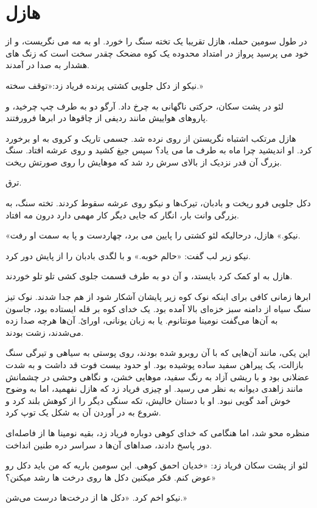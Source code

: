 \documentclass{book}
\begin{document}
\chapter{هازل}
در طول سومین حمله، هازل تقریبا یک تخته سنگ را خورد. او به مه می نگریست، و از خود می پرسید  پرواز در امتداد محدوده یک کوه مضحک چقدر سخت است که زنگ های هشدار به صدا در آمدند.

نیکو از دکل جلویی کشتی پرنده فریاد زد:«توقف سخته.»

لئو در پشت سکان، حرکتی ناگهانی به چرخ داد. آرگو دو به طرف چپ چرخید، و پاروهای هواییش مانند ردیفی از چاقوها در ابرها فرورفتند.

هازل مرتکب اشتباه نگریستن از روی نرده شد. جسمی تاریک و کروی به او برخورد کرد. او اندیشید چرا ماه به طرف ما می یاد؟ سپس جیغ کشید و روی عرشه افتاد. سنگ بزرگ آن قدر نزدیک از بالای سرش رد شد که موهایش را روی صورتش ریخت.

ترق.

دکل جلویی فرو ریخت و بادبان، تیرک‌ها و نیکو روی عرشه سقوط کردند. تخته سنگ، به بزرگی وانت بار، انگار که جایی دیگر کار مهمی دارد درون مه افتاد.

«نیکو.» هازل، درحالیکه لئو کشتی را پایین می برد، چهاردست و پا به سمت او رفت.

نیکو زیر لب گفت: «حالم خوبه.» و با لگدی بادبان را از پایش دور کرد.

هازل به او کمک کرد بایستد، و آن دو به طرف قسمت جلوی کشی تلو تلو خوردند.

ابرها زمانی کافی برای اینکه نوک کوه زیر پایشان آشکار شود از هم جدا شدند. نوک تیز سنگ سیاه از دامنه سبز خزه‌ای بالا آمده بود. یک خدای کوه بر قله ایستاده بود، جاسون به آن‌ها می‌گفت نومینا مونتانوم. یا به زبان یونانی، اورائ. آن‌ها هرچه صدا زده می‌شدند، زشت بودند.

این یکی، مانند آن‌هایی که با آن روبرو شده بودند، روی پوستی به سیاهی و تیرگی سنگ بازالت، یک پیراهن سفید ساده پوشیده بود. او حدود بیست فوت قد داشت و به شدت عضلانی بود و با ریشی آزاد به رنگ سفید، موهایی خشن، و نگاهی وحشی در چشمانش مانند زاهدی دیوانه به نظر می رسید. او چیزی فریاد زد که هازل نفهمید، اما به وضوح خوش آمد گویی نبود. او با دستان خالیش، تکه سنگی دیگر را از کوهش بلند کرد و شروع به در آوردن آن به شکل یک توپ کرد.

منظره محو شد، اما هنگامی که خدای کوهی دوباره فریاد زد، بقیه نومینا ها از فاصله‌ای دور پاسخ دادند، صداهای آن‌ها د سراسر دره طنین انداخت.

لئو از پشت سکان فریاد زد: «خدیان احمق کوهی. این سومین باریه که من باید دکل رو عوض کنم. فکر میکنین دکل ها روی درخت ها رشد میکنن؟»

نیکو اخم کرد. «دکل ها از درخت‌ها درست می‌شن.»
\end{document}
